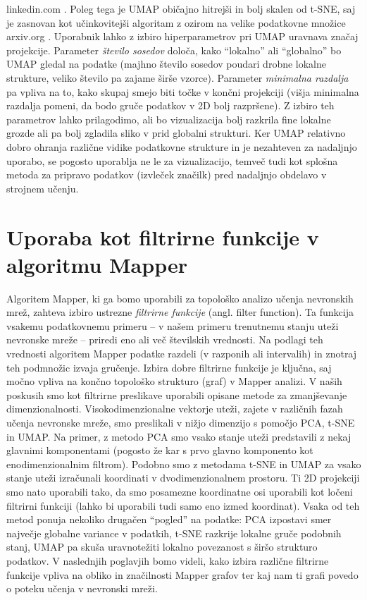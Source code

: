 linkedin.com
. Poleg tega je UMAP običajno hitrejši in bolj skalen od t-SNE, saj je zasnovan kot učinkovitejši algoritam z ozirom na velike podatkovne množice
arxiv.org
. Uporabnik lahko z izbiro hiperparametrov pri UMAP uravnava značaj projekcije. Parameter \textit{število sosedov} določa, kako “lokalno” ali “globalno” bo UMAP gledal na podatke (majhno število sosedov poudari drobne lokalne strukture, veliko število pa zajame širše vzorce). Parameter \textit{minimalna razdalja} pa vpliva na to, kako skupaj smejo biti točke v končni projekciji (višja minimalna razdalja pomeni, da bodo gruče podatkov v 2D bolj razpršene). Z izbiro teh parametrov lahko prilagodimo, ali bo vizualizacija bolj razkrila fine lokalne grozde ali pa bolj zgladila sliko v prid globalni strukturi. Ker UMAP relativno dobro ohranja različne vidike podatkovne strukture in je nezahteven za nadaljnjo uporabo, se pogosto uporablja ne le za vizualizacijo, temveč tudi kot splošna metoda za pripravo podatkov (izvleček značilk) pred nadaljnjo obdelavo v strojnem učenju. \section{Uporaba kot filtrirne funkcije v algoritmu Mapper}
Algoritem Mapper, ki ga bomo uporabili za topološko analizo učenja nevronskih mrež, zahteva izbiro ustrezne \textit{filtrirne funkcije} (angl. filter function). Ta funkcija vsakemu podatkovnemu primeru – v našem primeru trenutnemu stanju uteži nevronske mreže – priredi eno ali več številskih vrednosti. Na podlagi teh vrednosti algoritem Mapper podatke razdeli (v razponih ali intervalih) in znotraj teh podmnožic izvaja gručenje. Izbira dobre filtrirne funkcije je ključna, saj močno vpliva na končno topološko strukturo (graf) v Mapper analizi. V naših poskusih smo kot filtrirne preslikave uporabili opisane metode za zmanjševanje dimenzionalnosti. Visokodimenzionalne vektorje uteži, zajete v različnih fazah učenja nevronske mreže, smo preslikali v nižjo dimenzijo s pomočjo PCA, t-SNE in UMAP. Na primer, z metodo PCA smo vsako stanje uteži predstavili z nekaj glavnimi komponentami (pogosto že kar s prvo glavno komponento kot enodimenzionalnim filtrom). Podobno smo z metodama t-SNE in UMAP za vsako stanje uteži izračunali koordinati v dvodimenzionalnem prostoru. Ti 2D projekciji smo nato uporabili tako, da smo posamezne koordinatne osi uporabili kot ločeni filtrirni funkciji (lahko bi uporabili tudi samo eno izmed koordinat). Vsaka od teh metod ponuja nekoliko drugačen “pogled” na podatke: PCA izpostavi smer največje globalne variance v podatkih, t-SNE razkrije lokalne gruče podobnih stanj, UMAP pa skuša uravnotežiti lokalno povezanost s širšo strukturo podatkov. V naslednjih poglavjih bomo videli, kako izbira različne filtrirne funkcije vpliva na obliko in značilnosti Mapper grafov ter kaj nam ti grafi povedo o poteku učenja v nevronski mreži.